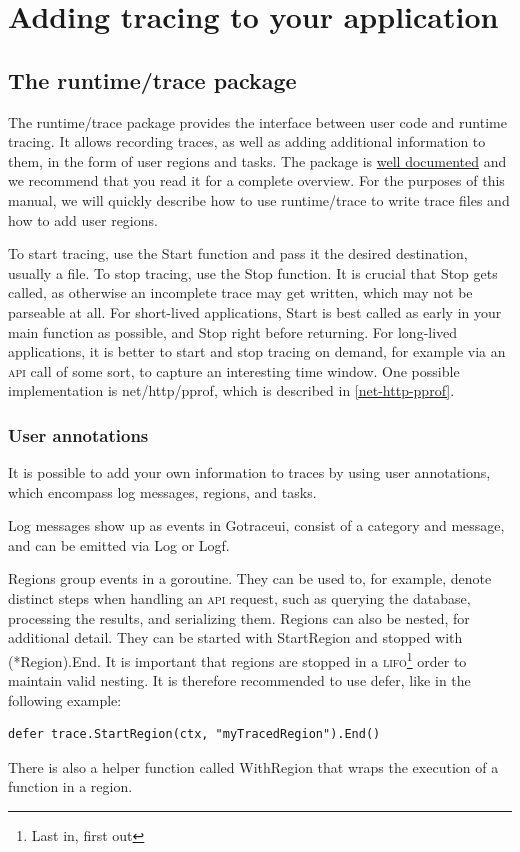 \documentclass[10pt,letterpaper,oneside,openany,english]{memoir}
\newcommand{\code}[1]{{\ttfamily\mbox{#1}}}
\begin{document}
\chapter{Adding tracing to your application}

\section{The \code{runtime/trace} package}

The \code{runtime/trace} package provides the interface between user code and runtime tracing.
It allows recording traces, as well as adding additional information to them, in the form of user regions and tasks.
The package is \href{https://pkg.go.dev/runtime/trace}{well documented}\cite{TracePackageRuntime2023} and we recommend that you read it for a complete overview.
For the purposes of this manual, we will quickly describe how to use \code{runtime/trace} to write trace files and how to add user regions.

To start tracing, use the \code{Start} function and pass it the desired destination, usually a file.
To stop tracing, use the \code{Stop} function.
It is crucial that \code{Stop} gets called, as otherwise an incomplete trace may get written, which may not be parseable at all.
For short-lived applications, \code{Start} is best called as early in your main function as possible, and \code{Stop} right before returning.
For long-lived applications, it is better to start and stop tracing on demand, for example via an \textsc{api} call of some sort, to capture an interesting time window.
One possible implementation is \code{net/http/pprof}, which is described in \cref{net-http-pprof}.

\subsection{User annotations}
It is possible to add your own information to traces by using user annotations, which encompass log messages, regions, and tasks.

Log messages show up as events in Gotraceui, consist of a category and message, and can be emitted via \code{Log} or \code{Logf}.

Regions group events in a goroutine.
They can be used to, for example, denote distinct steps when handling an \textsc{api} request, such as querying the database, processing the results, and serializing them.
Regions can also be nested, for additional detail. They can be started with \code{StartRegion} and stopped with \code{(*Region).End}.
It is important that regions are stopped in a \textsc{lifo}\footnote{Last in, first out} order to maintain valid nesting.
It is therefore recommended to use \code{defer}, like in the following example:
\begin{verbatim}
defer trace.StartRegion(ctx, "myTracedRegion").End()
\end{verbatim}
There is also a helper function called \code{WithRegion} that wraps the execution of a function in a region.
\end{document}
